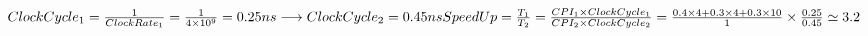 \setLTR
$
ClockCycle_1 = \frac{1}{ClockRate_1} = \frac{1}{4\times10^9} = 0.25{ns} \longrightarrow ClockCycle_2 = 0.45ns \\  \\
SpeedUp = \frac{T_1}{T_2} = \frac{CPI_1 \times ClockCycle_1}{CPI_2 \times ClockCycle_2} = \frac{0.4\times4 + 0.3\times4+0.3\times10}{1} \times \frac{0.25}{0.45} \simeq 3.2
$
\setRTL